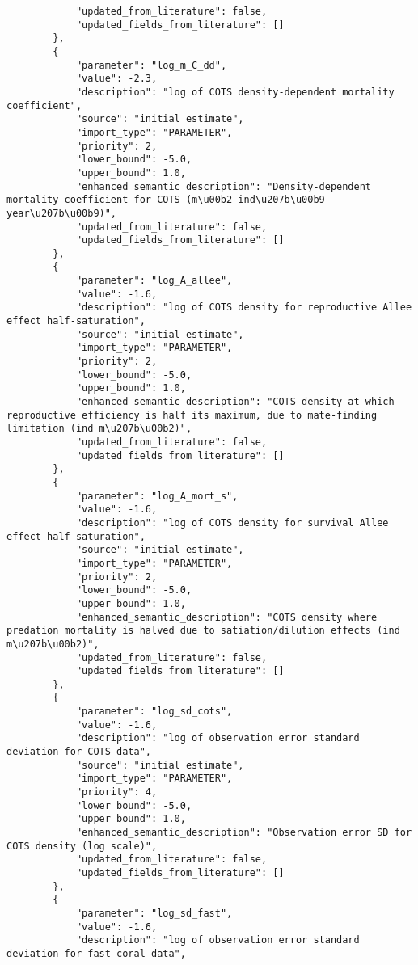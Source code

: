 \begin{lstlisting}
            "updated_from_literature": false,
            "updated_fields_from_literature": []
        },
        {
            "parameter": "log_m_C_dd",
            "value": -2.3,
            "description": "log of COTS density-dependent mortality coefficient",
            "source": "initial estimate",
            "import_type": "PARAMETER",
            "priority": 2,
            "lower_bound": -5.0,
            "upper_bound": 1.0,
            "enhanced_semantic_description": "Density-dependent mortality coefficient for COTS (m\u00b2 ind\u207b\u00b9 year\u207b\u00b9)",
            "updated_from_literature": false,
            "updated_fields_from_literature": []
        },
        {
            "parameter": "log_A_allee",
            "value": -1.6,
            "description": "log of COTS density for reproductive Allee effect half-saturation",
            "source": "initial estimate",
            "import_type": "PARAMETER",
            "priority": 2,
            "lower_bound": -5.0,
            "upper_bound": 1.0,
            "enhanced_semantic_description": "COTS density at which reproductive efficiency is half its maximum, due to mate-finding limitation (ind m\u207b\u00b2)",
            "updated_from_literature": false,
            "updated_fields_from_literature": []
        },
        {
            "parameter": "log_A_mort_s",
            "value": -1.6,
            "description": "log of COTS density for survival Allee effect half-saturation",
            "source": "initial estimate",
            "import_type": "PARAMETER",
            "priority": 2,
            "lower_bound": -5.0,
            "upper_bound": 1.0,
            "enhanced_semantic_description": "COTS density where predation mortality is halved due to satiation/dilution effects (ind m\u207b\u00b2)",
            "updated_from_literature": false,
            "updated_fields_from_literature": []
        },
        {
            "parameter": "log_sd_cots",
            "value": -1.6,
            "description": "log of observation error standard deviation for COTS data",
            "source": "initial estimate",
            "import_type": "PARAMETER",
            "priority": 4,
            "lower_bound": -5.0,
            "upper_bound": 1.0,
            "enhanced_semantic_description": "Observation error SD for COTS density (log scale)",
            "updated_from_literature": false,
            "updated_fields_from_literature": []
        },
        {
            "parameter": "log_sd_fast",
            "value": -1.6,
            "description": "log of observation error standard deviation for fast coral data",

\end{lstlisting}
